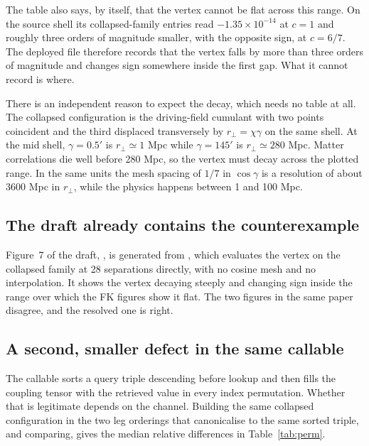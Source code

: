 The table also says, by itself, that the vertex cannot be flat across this
range. On the source shell its collapsed-family entries read
$-1.35\times10^{-14}$ at $c=1$ and roughly three orders of magnitude
smaller, with the opposite sign, at $c=6/7$. The deployed file therefore
records that the vertex falls by more than three orders of magnitude and
changes sign somewhere inside the first gap. What it cannot record is
where.

There is an independent reason to expect the decay, which needs no table at
all. The collapsed configuration is the driving-field cumulant with two
points coincident and the third displaced transversely by $r_\perp =
\chi\gamma$ on the same shell. At the mid shell, $\gamma=0.5'$ is
$r_\perp\simeq1$ Mpc while $\gamma=145'$ is $r_\perp\simeq280$ Mpc. Matter
correlations die well before 280 Mpc, so the vertex must decay across the
plotted range. In the same units the mesh spacing of $1/7$ in $\cos\gamma$
is a resolution of about 3600 Mpc in $r_\perp$, while the physics happens
between 1 and 100 Mpc.

\subsection{The draft already contains the counterexample}

Figure~7 of the draft, , is
generated from , which evaluates the
vertex on the collapsed family at 28 separations directly, with no cosine
mesh and no interpolation. It shows the vertex decaying steeply and
changing sign inside the range over which the FK figures show it flat. The
two figures in the same paper disagree, and the resolved one is right.

\subsection{A second, smaller defect in the same callable}

The callable sorts a query triple descending before lookup and then fills
the coupling tensor with the retrieved value in every index permutation.
Whether that is legitimate depends on the channel. Building the same
collapsed configuration in the two leg orderings that canonicalise to the
same sorted triple, and comparing, gives the median relative differences in
Table~\ref{tab:perm}.

